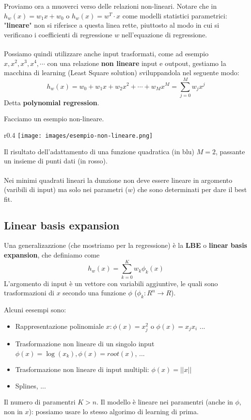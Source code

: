 \hspace{-15pt}Proviamo ora a muoverci verso delle relazioni non-lineari. Notare che in $h_w(x) = w_1 x + w_0$ o $h_w(x) = w^T \cdot x$ 
come modelli statistici parametrici: "\textbf{lineare}" non si riferisce a questa linea rette, piuttosto al modo in cui
si verificano i coefficienti di regressione $w$ nell'equazione di regressione.\\\\
Possiamo quindi utilizzare anche input trasformati, come ad esempio $x, x^2, x^3, x^4, \cdots$ con una relazione \textbf{non lineare} input e outpout, 
gestiamo la macchina di learning (Least Square solution) sviluppandola nel seguente modo:
$$h_w(x) = w_0 + w_1 x + w_2 x^2 + \cdots + w_Mx^M = \sum_{j=0}^{M}w_j x^j$$
Detta \textbf{polynomial regression}.
\newpage
\begin{example}
    Facciamo un esempio non-lineare.
\end{example}
\begin{wrapfigure}[10]{r}{0.4\textwidth}
    \vspace{-25pt}
    \centering
    \texttt{[image: images/esempio-non-lineare.png]}
\end{wrapfigure}
Il risultato dell'adattamento di una funzione quadratica (in blu) $M=2$, passante un insieme di punti dati (in rosso). \\\\
Nei minimi quadrati lineari la dunzione non deve essere lineare in argomento (varibili di input) ma solo nei parametri ($w$) che sono
determinati per dare il best fit.

\subsection{Linear basis expansion}
Una generalizazzione (che mostriamo per la regressione) è la \textbf{LBE} o \textbf{linear basis expansion}, che definiamo come
$$h_w(x) = \sum_{k=0}^{K}w_k\phi_k(x)$$
L'argomento di input è un vettore con variabili aggiuntive, le quali sono trasformazioni di $x$ secondo una funzione $\phi$ ($\phi_k: R^n \to R$).
\begin{example}
    Alcuni eesempi sono:
    \begin{itemize}
        \item Rappresentazione polinomiale $x: \phi(x) = x_j^2$ o $\phi(x) = x_jx_i$ ...
        \item Trasformazione non lineare di un singolo input $\phi(x) = \log(x_k), \phi(x) = root(x)$, ...
        \item Trasformazione non lineare di input multipli: $\phi(x) = ||x||$
        \item Splines, ...
    \end{itemize}
\end{example}
\hspace{-15pt}Il numero di paramentri $K>n$. Il modello è lineare nei paramentri (anche in $\phi$, non in $x$): possiamo usare lo stesso
algorimo di learning di prima.

